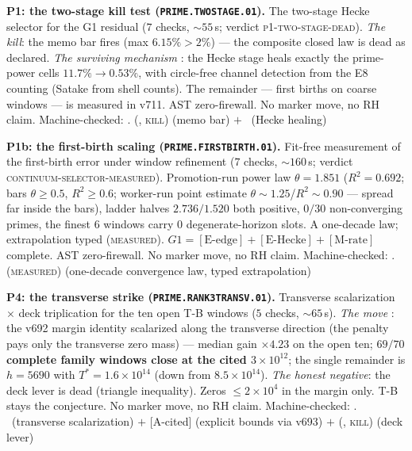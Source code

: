 \par\smallskip\noindent\textbf{P1: the two-stage kill test
(\texttt{PRIME.TWOSTAGE.01}).}
The two-stage Hecke selector for the G1 residual ($7$ checks,
${\sim}55$\,s; verdict \textsc{p1-two-stage-dead}).  \emph{The
kill}: the memo bar fires (max $6.15\%>2\%$) --- the composite
closed law is dead as declared.  \emph{The surviving mechanism} \mE:
the Hecke stage heals exactly the prime-power cells
$11.7\%\to0.53\%$, with circle-free channel detection from the E8
counting (Satake from shell counts).  The remainder --- first
births on coarse windows --- is measured in v711.  AST
zero-firewall.  No marker move, no RH claim.
Machine-checked: .
(\mE, \textsc{kill}) (memo bar) $+$ \mE\ (Hecke healing)
\par\smallskip


\par\smallskip\noindent\textbf{P1b: the first-birth scaling
(\texttt{PRIME.FIRSTBIRTH.01}).}
Fit-free measurement of the first-birth error under window
refinement ($7$ checks, ${\sim}160$\,s; verdict
\textsc{continuum-selector-measured}).  Promotion-run power law
$\theta=1.851$ ($R^2=0.692$; bars $\theta\ge0.5$, $R^2\ge0.6$;
worker-run point estimate $\theta\sim1.25$/$R^2\sim0.90$ --- spread
far inside the bars), ladder halves $2.736/1.520$ both positive,
$0/30$ non-converging primes, the finest $6$ windows carry $0$
degenerate-horizon slots.  A one-decade law; extrapolation typed
(\textsc{measured}).  $G1=[\mathrm{E\mbox{-}edge}]+
[\mathrm{E\mbox{-}Hecke}]+[\mathrm{M\mbox{-}rate}]$ complete.  AST
zero-firewall.  No marker move, no RH claim.
Machine-checked: .
(\textsc{measured}) (one-decade convergence law, typed
extrapolation)
\par\smallskip


\par\smallskip\noindent\textbf{P4: the transverse strike
(\texttt{PRIME.RANK3TRANSV.01}).}
Transverse scalarization $\times$ deck triplication for the ten open
T-B windows ($5$ checks, ${\sim}65$\,s).  \emph{The move} \mE: the
v692 margin identity scalarized along the transverse direction (the
penalty pays only the transverse zero mass) --- median gain
$\times4.23$ on the open ten; \textbf{$69/70$ complete family
windows close at the cited $3\times10^{12}$}; the single remainder
is $h=5690$ with $T^*=1.6\times10^{14}$ (down from
$8.5\times10^{14}$).  \emph{The honest negative}: the deck lever is
dead (triangle inequality).  Zeros $\le2\times10^4$ in the margin
only.  T-B stays the conjecture.  No marker move, no RH claim.
Machine-checked: .
\mE\ (transverse scalarization) $+$ [A-cited] (explicit bounds via
v693) $+$ (\mE, \textsc{kill}) (deck lever)
\par\smallskip


